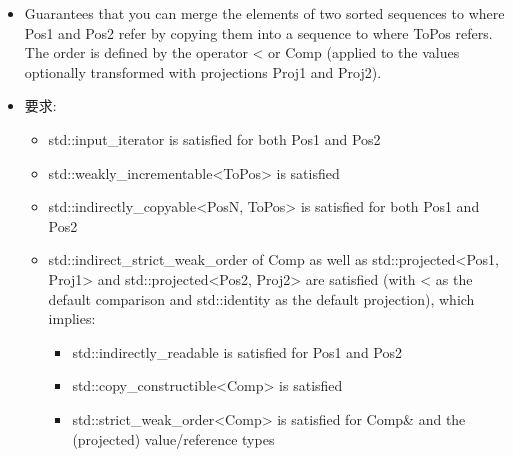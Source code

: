 
\begin{itemize}
\item
Guarantees that you can merge the elements of two sorted sequences to where Pos1 and Pos2 refer by copying them into a sequence to where ToPos refers. The order is defined by the operator < or Comp (applied to the values optionally transformed with projections Proj1 and Proj2).

\item
要求:
\begin{itemize}
\item
std::input\_iterator is satisfied for both Pos1 and Pos2

\item
std::weakly\_incrementable<ToPos> is satisfied

\item
std::indirectly\_copyable<PosN, ToPos> is satisfied for both Pos1 and Pos2

\item
std::indirect\_strict\_weak\_order of Comp as well as std::projected<Pos1, Proj1> and std::projected<Pos2, Proj2> are satisfied (with < as the default comparison and std::identity as the default projection), which implies:

\begin{itemize}
\item
std::indirectly\_readable is satisfied for Pos1 and Pos2

\item
std::copy\_constructible<Comp> is satisfied

\item
std::strict\_weak\_order<Comp> is satisfied for Comp\& and the (projected) value/reference types
\end{itemize}
\end{itemize}
\end{itemize}


